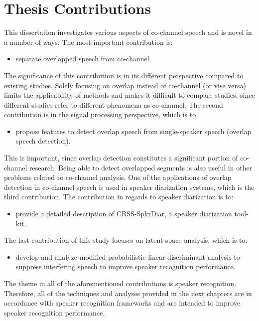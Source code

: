 \section{Thesis Contributions}
\label{sec:contributions}
This dissertation investigates various aspects of co-channel speech and is novel in a number of ways. 
The most important contribution is:
\begin{itemize}
	\item separate overlapped speech from co-channel.
\end{itemize}
The significance of this contribution is in its different perspective compared to existing studies. 
Solely focusing on overlap instead of co-channel (or vise versa) limits the applicability of methods and makes it difficult to compare studies, since different studies refer to different phenomena as co-channel. 
The second contribution is in the signal processing perspective, which is to
\begin{itemize}
	\item propose features to detect overlap speech from single-speaker speech (overlap speech detection).
\end{itemize}
This is important, since overlap detection constitutes a significant portion of co-channel research. 
Being able to detect overlapped segments is also useful in other problems related to co-channel analysis. 
One of the applications of overlap detection in co-channel speech is used in speaker diarization systems, which is the third contribution. 
The contribution in regards to speaker diarization is to:
\begin{itemize}
	\item provide a detailed description of CRSS-SpkrDiar, a speaker diarization tool-kit. 
\end{itemize}
The last contribution of this study focuses on latent space analysis, which is to:
\begin{itemize}
	\item develop and analyze modified probabilistic linear discriminant analysis to suppress interfering speech to improve speaker recognition performance. 
\end{itemize}
The theme in all of the aforementioned contributions is speaker recognition. 
Therefore, all of the techniques and analyses provided in the next chapters are in accordance with speaker recognition frameworks and are intended to improve speaker recognition performance. 